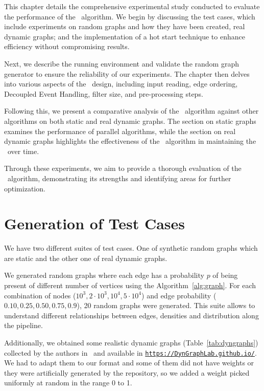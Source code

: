 This chapter details the comprehensive experimental study conducted to evaluate the performance of the \DPmst\ algorithm. We begin by discussing the test cases, which include experiments on random graphs and how they have been created, real dynamic graphs; and the implementation of a hot start technique to enhance efficiency without compromising results.

Next, we describe the running environment and validate the random graph generator to ensure the reliability of our experiments. The chapter then delves into various aspects of the \DPmst\ design, including input reading, edge ordering, Decoupled Event Handling, filter size, and pre-processing steps.

Following this, we present a comparative analysis of the \DPmst\ algorithm against other algorithms on both static and real dynamic graphs. The section on static graphs examines the performance of parallel algorithms, while the section on real dynamic graphs highlights the effectiveness of the \DPmst\ algorithm in maintaining the \mst\ over time.

Through these experiments, we aim to provide a thorough evaluation of the \DPmst\ algorithm, demonstrating its strengths and identifying areas for further optimization.

\section{Generation of Test Cases}

We have two different suites of test cases. One of synthetic random graphs which are static and the other one of real dynamic graphs.

We generated random graphs where each edge has a probability $p$ of being present of different number of vertices using the Algorithm~\ref{alg:graph}. For each combination of nodes ($10^3, 2\cdot10^3, 10^4, 5\cdot10^4$) and edge probability ($0.10, 0.25, 0.50, 0.75, 0.9$), 20 random graphs were generated. This suite allows to understand different relationships between edges, densities and distribution along the pipeline.

Additionally, we obtained some realistic dynamic graphs (Table~\ref{tab:dyngraphs}) collected by the authors in~\cite{Hanauer2022} and available in \href{https://DynGraphLab.github.io/}{\texttt{https://DynGraphLab.github.io/}}. We had to adapt them to our format and some of them did not have weights or they were artificially generated by the repository, so we added a weight picked uniformly at random in the range 0 to 1.

